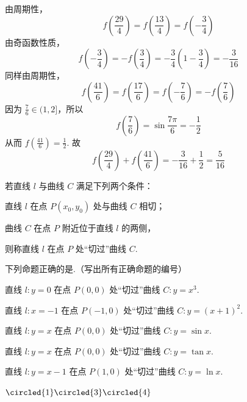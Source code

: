 \begin{solution}
由周期性，
\[
f\left(\frac{29}{4}\right)=f\left(\frac{13}{4}\right)=f\left(-\frac34\right)
\]
由奇函数性质，
\[
f\left(-\frac34\right)=-f\left(\frac34\right)
=-\frac34\left(1-\frac34\right)
=-\frac{3}{16}
\]
同样由周期性，
\[
f\left(\frac{41}{6}\right)=f\left(\frac{17}{6}\right)=f\left(-\frac76\right)
=-f\left(\frac76\right)
\]
因为 \(\frac76\in(1,2]\)，所以
\[
f\left(\frac76\right)=\sin\frac{7\pi}{6}=-\frac12
\]
从而 \(f\left(\frac{41}{6}\right)=\frac12\). 故
\[
f\left(\frac{29}{4}\right)+f\left(\frac{41}{6}\right)
=-\frac{3}{16}+\frac12=\frac{5}{16}
\]
\end{solution}

\begin{problem}
若直线 \(l\) 与曲线 \(C\) 满足下列两个条件：

\begin{circlelist}
\item 直线 \(l\) 在点 \(P(x_0, y_0)\) 处与曲线 \(C\) 相切；
\item 曲线 \(C\) 在点 \(P\) 附近位于直线 \(l\) 的两侧，
\end{circlelist}

则称直线 \(l\) 在点 \(P\) 处“切过”曲线 \(C\).

下列命题正确的是\fillinblank{}.（写出所有正确命题的编号）

\begin{circlelist}
\item 直线 \(l: y = 0\) 在点 \(P(0,0)\) 处“切过”曲线 \(C: y = x^3\).
\item 直线 \(l: x = -1\) 在点 \(P(-1,0)\) 处“切过”曲线 \(C: y = (x + 1)^2\).
\item 直线 \(l: y = x\) 在点 \(P(0,0)\) 处“切过”曲线 \(C: y = \sin x\).
\item 直线 \(l: y = x\) 在点 \(P(0,0)\) 处“切过”曲线 \(C: y = \tan x\).
\item 直线 \(l: y = x - 1\) 在点 \(P(1,0)\) 处“切过”曲线 \(C: y = \ln x\).
\end{circlelist}

\begin{answer}
\(\circled{1}\circled{3}\circled{4}\)
\end{answer}
\end{problem}

